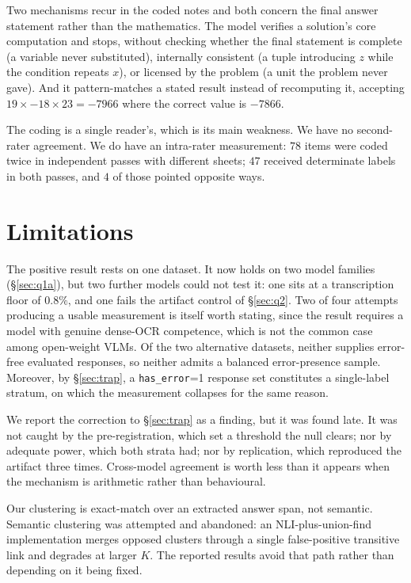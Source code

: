 \documentclass[10pt,twocolumn,letterpaper]{article}
\begin{document}
Two mechanisms recur in the coded notes and both concern the final
answer statement rather than the mathematics. The model verifies a
solution's core computation and stops, without checking whether the final
statement is complete (a variable never substituted), internally
consistent (a tuple introducing $z$ while the condition repeats $x$), or
licensed by the problem (a unit the problem never gave). And it
pattern-matches a stated result instead of recomputing it, accepting
$19 \times -18 \times 23 = -7966$ where the correct value is $-7866$.

The coding is a single reader's, which is its main weakness. We have no
second-rater agreement. We do have an intra-rater measurement: $78$ items
were coded twice in independent passes with different sheets; $47$ received
determinate labels in both passes, and $4$ of those pointed opposite ways.

\section{Limitations}
\label{sec:limitations}
The positive result rests on one dataset. It now holds on two model
families (\S\ref{sec:q1a}), but two further models could not test it: one
sits at a transcription floor of $0.8\%$, and one fails the artifact
control of \S\ref{sec:q2}. Two of four attempts producing a usable
measurement is itself worth stating, since the result requires a model
with genuine dense-OCR competence, which is not the common case among
open-weight VLMs. Of the two alternative datasets, neither supplies
error-free evaluated responses, so neither admits a balanced
error-presence sample. Moreover, by \S\ref{sec:trap}, a
\texttt{has\_error}=1 response set constitutes a single-label stratum, on
which the measurement collapses for the same reason.

We report the correction to \S\ref{sec:trap} as a finding, but it was
found late. It was not caught by the pre-registration, which set a
threshold the null clears; nor by adequate power, which both strata had;
nor by replication, which reproduced the artifact three times. Cross-model
agreement is worth less than it appears when the mechanism is arithmetic
rather than behavioural.

Our clustering is exact-match over an extracted answer span, not semantic.
Semantic clustering was attempted and abandoned: an NLI-plus-union-find
implementation merges opposed clusters through a single false-positive
transitive link and degrades at larger $K$. The reported results avoid
that path rather than depending on it being fixed.
\end{document}
